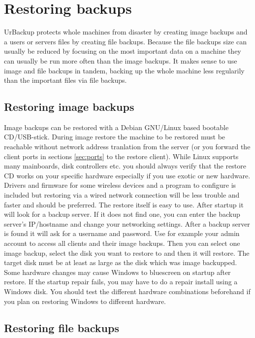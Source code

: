 \documentclass[a4paper,10pt]{article}
\begin{document}
\section{Restoring backups}

UrBackup protects whole machines from disaster by creating image backups and a users or servers files by creating file backups. Because the file backups size can usually be reduced by focusing on the most important data on a machine they can usually be run more often than the image backups. It makes sense to use image and file backups in tandem, backing up the whole machine less regularily than the important files via file backups.

\subsection{Restoring image backups}

Image backups can be restored with a Debian GNU/Linux based bootable CD/USB-stick. During image restore the machine to be restored must be reachable without network address tranlation from the server (or you forward the client ports in sections \ref{sec:ports} to the restore client).
While Linux supports many mainboards, disk controllers etc. you should always verify that the restore CD works on your specific hardware especially if you use exotic or new hardware.
Drivers and firmware for some wireless devices and a program to configure is included but restoring via a wired network connection will be less trouble and faster and should be preferred.
The restore itself is easy to use. After startup it will look for a backup server. If it does not find one, you can enter the backup server's IP/hostname and change your networking settings. After a backup server is found it will ask for a username and password. Use for example your admin account to access all clients and their image backups.
Then you can select one image backup, select the disk you want to restore to and then it will restore. The target disk must be at least as large as the disk which was image backupped.
Some hardware changes may cause Windows to bluescreen on startup after restore. If the startup repair fails, you may have to do a repair install using a Windows disk. You should test the different hardware combinations beforehand if you plan on restoring Windows to different hardware.

\subsection{Restoring file backups}
\end{document}
